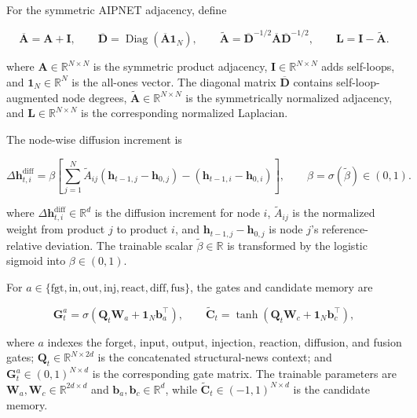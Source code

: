 \documentclass[letterpaper]{article} %
\begin{document}
For the symmetric AIPNET adjacency, define

\begin{equation}
\overline{\mathbf A}=\mathbf A+\mathbf I,\qquad
\overline{\mathbf D}
=\operatorname{Diag}(\overline{\mathbf A}\mathbf1_N),\qquad
\widetilde{\mathbf A}
=\overline{\mathbf D}^{-1/2}
\overline{\mathbf A}
\overline{\mathbf D}^{-1/2},
\qquad
\mathbf L=\mathbf I-\widetilde{\mathbf A}.
\label{eq:app-adjacency-normalization}
\end{equation}

where \(\mathbf A\in\mathbb R^{N\times N}\) is the symmetric product adjacency, \(\mathbf I\in\mathbb R^{N\times N}\) adds self-loops, and \(\mathbf1_N\in\mathbb R^N\) is the all-ones vector. The diagonal matrix \(\overline{\mathbf D}\) contains self-loop-augmented node degrees, \(\widetilde{\mathbf A}\in\mathbb R^{N\times N}\) is the symmetrically normalized adjacency, and \(\mathbf L\in\mathbb R^{N\times N}\) is the corresponding normalized Laplacian.

The node-wise diffusion increment is

\begin{equation}
\Delta\mathbf h_{t,i}^{\mathrm{diff}}
=
\beta\left[
\sum_{j=1}^{N}\widetilde A_{ij}
(\mathbf h_{t-1,j}-\mathbf h_{0,j})
-(\mathbf h_{t-1,i}-\mathbf h_{0,i})
\right],
\qquad
\beta=\sigma(\widetilde\beta)\in(0,1).
\label{eq:app-node-diffusion}
\end{equation}

where \(\Delta\mathbf h_{t,i}^{\mathrm{diff}}\in\mathbb R^d\) is the diffusion increment for node \(i\), \(\widetilde A_{ij}\) is the normalized weight from product \(j\) to product \(i\), and \(\mathbf h_{t-1,j}-\mathbf h_{0,j}\) is node \(j\)'s reference-relative deviation. The trainable scalar \(\widetilde\beta\in\mathbb R\) is transformed by the logistic sigmoid into \(\beta\in(0,1)\).

For \(a\in\{\mathrm{fgt},\mathrm{in},\mathrm{out},\mathrm{inj},\mathrm{react},\mathrm{diff},\mathrm{fus}\}\), the gates and candidate memory are

\begin{equation}
\mathbf G_t^a
=\sigma(\mathbf Q_t\mathbf W_a+\mathbf1_N\mathbf b_a^\top),
\qquad
\widetilde{\mathbf C}_t
=\tanh(\mathbf Q_t\mathbf W_c+\mathbf1_N\mathbf b_c^\top),
\label{eq:app-gate-parameterization}
\end{equation}

where \(a\) indexes the forget, input, output, injection, reaction, diffusion, and fusion gates; \(\mathbf Q_t\in\mathbb R^{N\times2d}\) is the concatenated structural-news context; and \(\mathbf G_t^a\in(0,1)^{N\times d}\) is the corresponding gate matrix. The trainable parameters are \(\mathbf W_a,\mathbf W_c\in\mathbb R^{2d\times d}\) and \(\mathbf b_a,\mathbf b_c\in\mathbb R^d\), while \(\widetilde{\mathbf C}_t\in(-1,1)^{N\times d}\) is the candidate memory.
\end{document}
